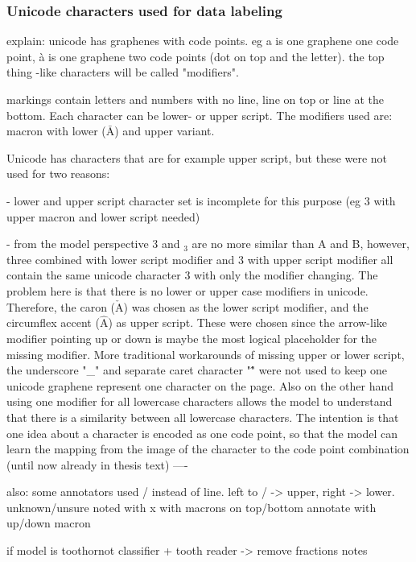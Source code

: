 \documentclass{article}
\begin{document}
\subsubsection{Unicode characters used for data labeling}

explain: unicode has graphenes with code points. eg a is one graphene one code point,
à is one graphene two code points (dot on top and the letter). the top thing -like characters will be called 
"modifiers".

markings contain letters and numbers with no line, line on top or line at the bottom.
Each character can be lower- or upper script. The modifiers used are: 
macron with lower ($\bar{\mathrm{A}}$) and upper variant.

Unicode \cite{unicode_homepage} has characters that are for example upper script, but 
these were not used for two reasons:

- lower and upper script character set is incomplete for this purpose (eg 3 with upper macron and lower script needed)

- from the model perspective 3 and $_3$ are no more similar than A and B, however, 
three combined with lower script modifier and 3 with upper script modifier 
all contain the same unicode character 3 with only the modifier changing. The 
problem here is that there is no lower or upper case modifiers in unicode. Therefore,
the caron ($\check{\mathrm{A}}$) was chosen as the lower script modifier, and the circumflex accent ($\hat{\mathrm{A}}$)
as upper script. These were chosen since the arrow-like modifier pointing up or down
is maybe the most logical placeholder for the missing modifier. More traditional 
workarounds of missing upper or lower script, the underscore "\_" and separate 
caret character "\^ " were not used to keep one unicode graphene represent one character 
on the page. Also on the other hand using one modifier for all lowercase characters allows 
the model to understand that there is a similarity between all lowercase characters.
The intention is that one idea about a character is encoded as one code point, so that 
the model can learn the mapping from the image of the character to the code point 
combination
(until now already in thesis text)
----

also: some annotators used / instead of line. left to / -> upper, right -> lower.
unknown/unsure noted with x with macrons on top/bottom
annotate with up/down macron

if model is toothornot classifier + tooth reader -> remove fractions notes
\end{document}
